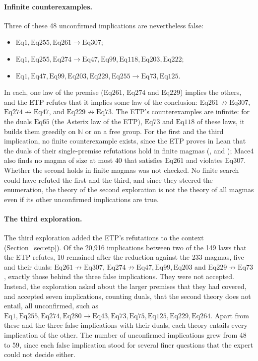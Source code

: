 \documentclass[11pt,a4paper]{article}
\theoremstyle{definition}
\theoremstyle{remark}
\newcommand{\Eq}[1]{\mathrm{Eq}#1}
\begin{document}
\paragraph{Infinite counterexamples.}
Three of these 48 unconfirmed implications are nevertheless false:
\begin{itemize}
  \item $\Eq{1}, \Eq{255}, \Eq{261} \to \Eq{307}$;
  \item $\Eq{1}, \Eq{255}, \Eq{274} \to \Eq{47}, \Eq{99}, \Eq{118}, \Eq{203}, \Eq{222}$;
  \item $\Eq{1}, \Eq{47}, \Eq{99}, \Eq{203}, \Eq{229}, \Eq{255} \to \Eq{73}, \Eq{125}$.
\end{itemize}
In each, one law of the premise ($\Eq{261}$, $\Eq{274}$ and $\Eq{229}$) implies the others, and the ETP refutes that it implies some law of the conclusion: $\Eq{261} \not\to \Eq{307}$, $\Eq{274} \not\to \Eq{47}$, and $\Eq{229} \not\to \Eq{73}$. The ETP's counterexamples are infinite: for the duals $\Eq{65}$ (the Asterix law of the ETP), $\Eq{73}$ and $\Eq{118}$ of these laws, it builds them greedily on $\mathbb{N}$ or on a free group. For the first and the third implication, no finite counterexample exists, since the ETP proves in Lean that the duals of their single-premise refutations hold in finite magmas (,  and ); Mace4 also finds no magma of size at most 40 that satisfies $\Eq{261}$ and violates $\Eq{307}$. Whether the second holds in finite magmas was not checked. No finite search could have refuted the first and the third, and since they steered the enumeration, the theory of the second exploration is not the theory of all magmas even if its other unconfirmed implications are true.

\paragraph{The third exploration.}
The third exploration added the ETP's refutations to the context (Section~\ref{sec:etp}). Of the 20,916 implications between two of the 149 laws that the ETP refutes, 10 remained after the reduction against the 233 magmas, five and their duals: $\Eq{261} \not\to \Eq{307}$, $\Eq{274} \not\to \Eq{47}, \Eq{99}, \Eq{203}$ and $\Eq{229} \not\to \Eq{73}$, exactly those behind the three false implications. They were not accepted. Instead, the exploration asked about the larger premises that they had covered, and accepted seven implications, counting duals, that the second theory does not entail, all unconfirmed, such as $\Eq{1}, \Eq{255}, \Eq{274}, \Eq{280} \to \Eq{43}, \Eq{73}, \Eq{75}, \Eq{125}, \Eq{229}, \Eq{264}$. Apart from these and the three false implications with their duals, each theory entails every implication of the other. The number of unconfirmed implications grew from 48 to 59, since each false implication stood for several finer questions that the expert could not decide either.
\end{document}
